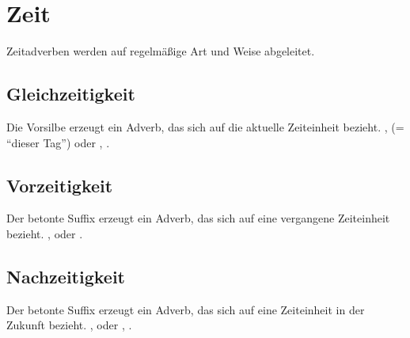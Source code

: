 \section{Zeit}
\noindent Zeitadverben werden auf regelm\"a\ss{}ige Art und Weise abgeleitet.

\subsection{Gleichzeitigkeit} Die Vorsilbe  erzeugt ein Adverb, das sich
auf die aktuelle Zeiteinheit bezieht.
,  (= "`dieser Tag"') oder , .

\subsection{Vorzeitigkeit} Der betonte Suffix  erzeugt ein Adverb, das sich
auf eine vergangene Zeiteinheit bezieht.
,  oder  .

\subsection{Nachzeitigkeit} Der betonte Suffix  erzeugt ein Adverb, das sich
auf eine Zeiteinheit in der Zukunft bezieht.
,  oder , .
